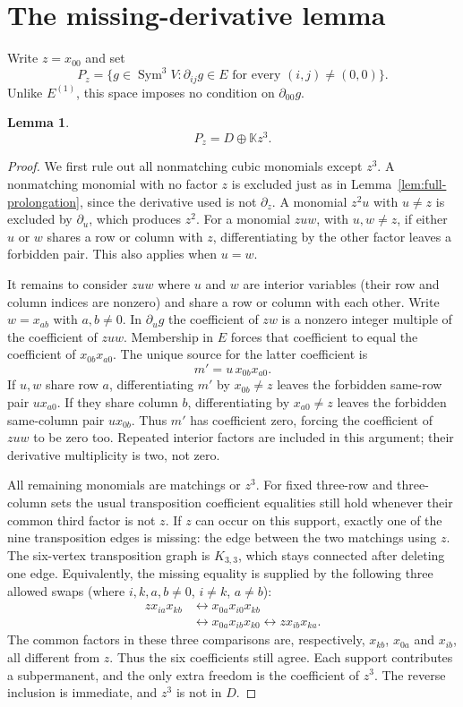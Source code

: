 \documentclass[11pt]{article}
\newtheorem{lemma}[theorem]{Lemma}
\theoremstyle{remark}
\newcommand{\kk}{\mathbb K}
\newcommand{\Sym}{\operatorname{Sym}}
\newcommand{\dd}{\partial}
\begin{document}
\section{The missing-derivative lemma}
Write $z=x_{00}$ and set
\[
 P_z=\{g\in\Sym^3V:\dd_{ij}g\in E\text{ for every }(i,j)\ne(0,0)\}.
\]
Unlike $E^{(1)}$, this space imposes no condition on $\dd_{00}g$.
\begin{lemma}\label{lem:missing}
\[
 P_z=D\oplus\kk z^3.
\]
\end{lemma}
\begin{proof}
We first rule out all nonmatching cubic monomials except $z^3$.
A nonmatching monomial with no factor $z$ is excluded just as in
Lemma~\ref{lem:full-prolongation}, since the derivative used is not $\dd_z$.
A monomial $z^2u$ with $u\ne z$ is excluded by $\dd_u$, which produces
$z^2$. For a monomial $zuw$, with $u,w\ne z$, if either $u$ or $w$ shares
a row or column with $z$, differentiating by the other factor leaves a
forbidden pair. This also applies when $u=w$.

It remains to consider $zuw$ where $u$ and $w$ are interior variables
(their row and column indices are nonzero) and share a row or column with
each other. Write $w=x_{ab}$ with $a,b\ne0$. In $\dd_u g$ the
coefficient of $zw$ is a nonzero integer multiple of the coefficient of
$zuw$. Membership in $E$ forces that coefficient to equal the coefficient
of $x_{0b}x_{a0}$. The unique source for the latter coefficient is
\[
 m'=u\,x_{0b}x_{a0}.
\]
If $u,w$ share row $a$, differentiating $m'$ by $x_{0b}\ne z$ leaves
the forbidden same-row pair $u x_{a0}$. If they share column $b$,
differentiating by $x_{a0}\ne z$ leaves the forbidden same-column pair
$u x_{0b}$. Thus $m'$ has coefficient zero, forcing the coefficient of
$zuw$ to be zero too. Repeated interior factors are included in this
argument; their derivative multiplicity is two, not zero.

All remaining monomials are matchings or $z^3$. For fixed three-row and
three-column sets the usual transposition coefficient equalities still
hold whenever their common third factor is not $z$. If $z$ can occur on
this support, exactly one of the nine transposition edges is missing:
the edge between the two matchings using $z$. The six-vertex transposition
graph is $K_{3,3}$, which stays connected after deleting one edge.
Equivalently, the missing equality is supplied by the following three
allowed swaps (where $i,k,a,b\ne0$, $i\ne k$, $a\ne b$):
\begin{align*}
 z x_{ia}x_{kb}
 &\longleftrightarrow x_{0a}x_{i0}x_{kb}\\
 &\longleftrightarrow x_{0a}x_{ib}x_{k0}
 \longleftrightarrow z x_{ib}x_{ka}.
\end{align*}
The common factors in these three comparisons are, respectively,
$x_{kb}$, $x_{0a}$ and $x_{ib}$, all different from $z$. Thus the six
coefficients still agree. Each support contributes a subpermanent, and
the only extra freedom is the coefficient of $z^3$.
The reverse inclusion is immediate, and $z^3$ is not in $D$.
\end{proof}
\end{document}

